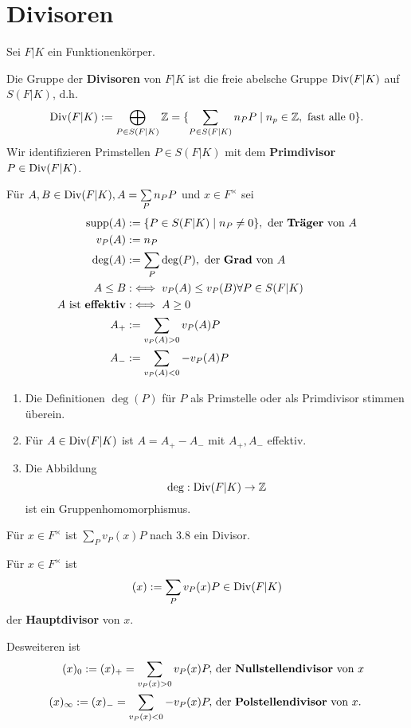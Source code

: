 \section{Divisoren}
Sei $F|K$ ein Funktionenkörper.

\begin{definition}
    Die Gruppe der \textbf{Divisoren} von $F|K$ ist die freie abelsche Gruppe $\operatorname{Div}(F|K)$ auf $S(F|K)$, d.h.
    $$ \operatorname{Div}(F|K) := \bigoplus\limits_{P \in S(F|K)} \mathbb{Z} = \{\sum\limits_{P \in S(F|K)} n_P P \mid n_p \in \mathbb{Z}, \text{ fast alle }0\}.$$
    Wir identifizieren Primstellen $P \in S(F|K)$ mit dem \textbf{Primdivisor} $P \in \operatorname{Div}(F|K)$.

    Für $A,B \in \operatorname{Div}(F|K), A = \sum\limits_P n_P P$ und $x \in F^{\times}$ sei 
    \begin{align*}
        \operatorname{supp}(A) &:= \{P \in S(F|K) \mid n_P \ne 0\}, \text{ der \textbf{Träger} von }A\\
        v_P(A) &:= n_P\\
        \deg(A) &:= \sum\limits_P \deg(P), \text{ der \textbf{Grad} von }A\\
        A \leq B &:\iff v_P(A) \leq v_P(B) \forall P \in S(F|K)\\
        A \text{ ist \textbf{effektiv}} &:\iff A \geq 0\\
        A_+ &:= \sum\limits_{v_P(A) > 0} v_P(A) P\\
        A_- &:= \sum\limits_{v_P(A) < 0} -v_P(A) P
    \end{align*}
\end{definition}

\begin{bemerkungnr}
    \begin{enumerate}
        \item Die Definitionen $\deg(P)$ für $P$ als Primstelle oder als Primdivisor stimmen überein.
        \item Für $A \in \operatorname{Div}(F|K)$ ist $A = A_+ - A_-$ mit $A_+,A_-$ effektiv.
        \item Die Abbildung
        $$ \deg: \operatorname{Div}(F|K) \to \mathbb{Z}$$
        ist ein Gruppenhomomorphismus.
    \end{enumerate}
\end{bemerkungnr}

\begin{beispiel}
    Für $x \in F^{\times}$ ist $\sum\limits_P v_P(x) P$ nach 3.8 ein Divisor.
\end{beispiel}

\begin{definition}
    Für $x \in F^{\times}$ ist
    $$ (x) := \sum\limits_P v_P(x) P \in \operatorname{Div}(F|K)$$
    der \textbf{Hauptdivisor} von $x$.

    Desweiteren ist
    \begin{align*}
        (x)_0 := (x)_+ = \sum\limits_{v_P(x) > 0} v_P(x) P, & \text{ der \textbf{Nullstellendivisor} von } x\\
        (x)_\infty := (x)_- = \sum\limits_{v_P(x) < 0} -v_P(x) P, & \text{ der \textbf{Polstellendivisor} von } x.\\
    \end{align*}
\end{definition}

